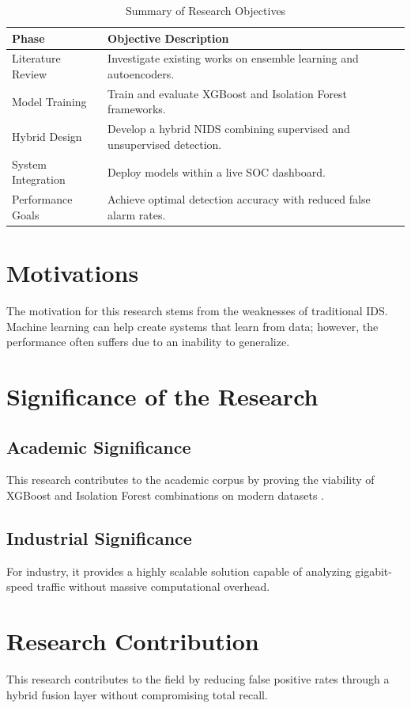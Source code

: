 \documentclass[12pt, a4paper]{report}
\begin{document}
\begin{table}[htbp]
    \centering
    \caption{Summary of Research Objectives}
    \vspace{0.3cm}
    \begin{tabular}{|p{}|p{}|}
    \hline
    \textbf{Phase} & \textbf{Objective Description} \\ \hline
    Literature Review & Investigate existing works on ensemble learning and autoencoders. \\ \hline
    Model Training & Train and evaluate XGBoost and Isolation Forest frameworks. \\ \hline
    Hybrid Design & Develop a hybrid NIDS combining supervised and unsupervised detection. \\ \hline
    System Integration & Deploy models within a live SOC dashboard. \\ \hline
    Performance Goals & Achieve optimal detection accuracy with reduced false alarm rates. \\ \hline
    \end{tabular}
    \label{tab:objectives}
\end{table}

\section{Motivations}
The motivation for this research stems from the weaknesses of traditional IDS. Machine learning can help create systems that learn from data; however, the performance often suffers due to an inability to generalize.

\section{Significance of the Research}
\subsection{Academic Significance}
This research contributes to the academic corpus by proving the viability of XGBoost and Isolation Forest combinations on modern datasets \cite{ref4}.
\subsection{Industrial Significance}
For industry, it provides a highly scalable solution capable of analyzing gigabit-speed traffic without massive computational overhead.

\section{Research Contribution}
This research contributes to the field by reducing false positive rates through a hybrid fusion layer without compromising total recall.
\end{document}
